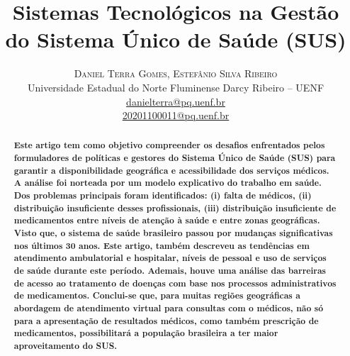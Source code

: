 \documentclass[twoside]{article}
\title{\vspace{-10mm}\fontsize{18pt}{20pt}\selectfont\textbf{Sistemas Tecnológicos na Gestão do Sistema Único de Saúde (SUS)}}
\author{
\large
\textsc{Daniel Terra Gomes,} \textsc{Estefânio Silva Ribeiro}\\[2mm]
\large Universidade Estadual do Norte Fluminense Darcy Ribeiro – UENF\\[2mm]
\smallsize \href{mailto:danielterra@pq.uenf.br}{danielterra@pq.uenf.br}\\[2mm]
\smallsize \href{mailto:20201100011@pq.uenf.br}{20201100011@pq.uenf.br}\\[2mm]
}
\date{}
\begin{document}
\maketitle

\thispagestyle{fancy}


\begin{abstract}
  \textbf{Este artigo tem como objetivo compreender os desafios enfrentados pelos formuladores de políticas e gestores do Sistema Único de Saúde (SUS) para garantir a disponibilidade geográfica e acessibilidade dos serviços médicos. A análise foi norteada por um modelo explicativo do trabalho em saúde. Dos problemas principais foram identificados: (i) falta de médicos, (ii) distribuição insuficiente desses profissionais, (iii) distribuição insuficiente de medicamentos entre níveis de atenção à saúde e entre zonas geográficas. 
Visto que, o sistema de saúde brasileiro passou por mudanças significativas nos últimos 30 anos. Este artigo, também descreveu as tendências em atendimento ambulatorial e hospitalar, níveis de pessoal e uso de serviços de saúde durante este período. Ademais, houve uma análise das barreiras de acesso ao tratamento de doenças com base nos processos administrativos de medicamentos.
  Conclui-se que, para muitas regiões geográficas a abordagem de atendimento virtual para consultas com o médicos, não só para a apresentação de resultados médicos, como também prescrição de medicamentos, possibilitará a população brasileira a ter maior aproveitamento do SUS.}
\end{abstract}

\vspace{2mm}
\end{document}
